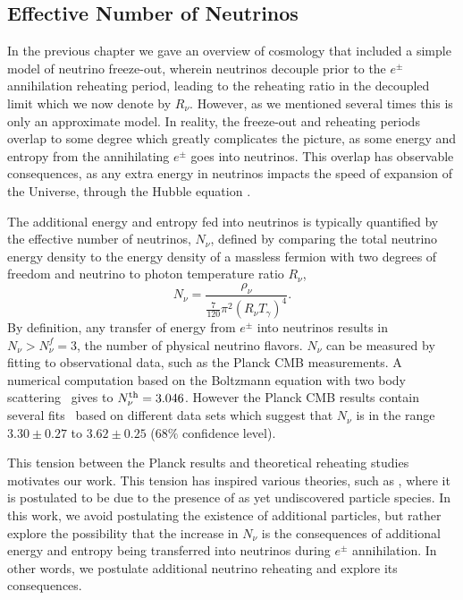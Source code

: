 \subsection{Effective Number of Neutrinos}\label{sec:N_nu}
In the previous chapter we gave an overview of cosmology that included a simple model of neutrino freeze-out, wherein neutrinos decouple prior to the $e^\pm$ annihilation reheating period, leading to the reheating ratio in the decoupled limit  which we now denote by $R_\nu$. However, as we mentioned several times this is only an approximate model. In reality, the freeze-out and reheating periods overlap to some degree which greatly complicates the picture, as some energy and entropy from the annihilating $e^\pm$ goes into neutrinos.  This overlap has observable consequences, as any extra energy in neutrinos impacts the speed of expansion of the Universe, through the Hubble equation .

The additional energy and entropy fed into neutrinos is typically quantified by the effective number of neutrinos, $N_\nu$, defined by comparing the total neutrino energy density to the energy density of a massless fermion with two degrees of freedom and neutrino to photon temperature ratio $R_\nu$,
\begin{equation}
N_{\nu}=\frac{\rho_\nu}{\frac{7}{120}\pi^2  \left(R_\nu T_\gamma\right)^4}.
\end{equation}
 By definition, any transfer of energy from $e^\pm$ into neutrinos results in $N_\nu>N_\nu^f=3$, the number of physical neutrino flavors.  $N_\nu$ can be  measured by fitting to observational data, such as the Planck CMB measurements. A numerical computation based on the Boltzmann equation with two body scattering~\cite{Mangano2005} gives to $N_{\nu}^{\rm th}=3.046$. However the Planck CMB results contain several fits~\cite{Planck} based on different data sets which suggest that $N_\nu$ is in the range $3.30\pm 0.27$ to $3.62\pm0.25$ ($68\%$ confidence level). 

This tension between the Planck results and theoretical reheating studies motivates our work. This tension has inspired various theories, such as \cite{Weinberg:2013kea}, where it is postulated to be due to the presence of as yet undiscovered particle species. In this work, we avoid postulating the existence of additional particles, but rather explore the possibility that the increase in $N_\nu$ is the consequences of additional energy and entropy being transferred into neutrinos during $e^\pm$ annihilation.  In other words, we postulate additional neutrino reheating and explore its consequences.



